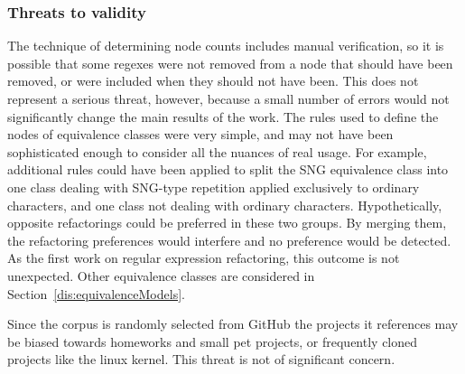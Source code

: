 \subsubsection{Threats to validity}
The technique of determining node counts includes manual verification, so it is possible that some regexes were not removed from a node that should have been removed, or were included when they should not have been.  This does not represent a serious threat, however, because a small number of errors would not significantly change the main results of the work.
The rules used to define the nodes of equivalence classes were very simple, and may not have been sophisticated enough to consider all the nuances of real usage.  For example, additional rules could have been applied to split the SNG equivalence class into one class dealing with SNG-type repetition applied exclusively to ordinary characters, and one class not dealing with ordinary characters.  Hypothetically, opposite refactorings could be preferred in these two groups.  By merging them, the refactoring preferences would interfere and no preference would be detected. As the first work on regular expression refactoring, this outcome is not unexpected.  Other equivalence classes are considered in Section~\ref{dis:equivalenceModels}.

Since the corpus is randomly selected from GitHub the projects it references may be biased towards homeworks and small pet projects, or frequently cloned projects like the linux kernel.  This threat is not of significant concern.
